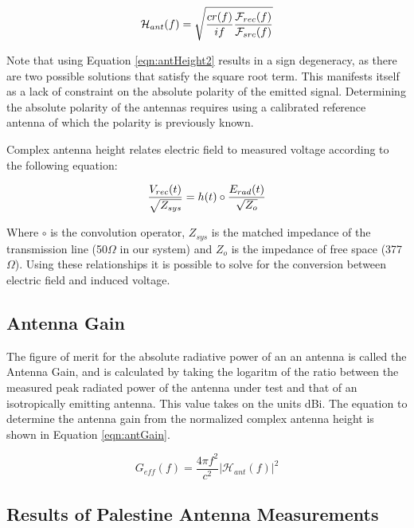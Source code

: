 \begin{equation}
\mathcal{H}_{ant}(f) = \sqrt{ \frac{c r(f)}{if} \frac{\mathcal{F}_{rec}(f)}{\mathcal{F}_{src}(f)} } \\
\label{eqn:antHeight2}
\end{equation}

Note that using Equation \ref{eqn:antHeight2} results in a sign degeneracy, as there are two possible solutions that satisfy the square root term.  This manifests itself as a lack of constraint on the absolute polarity of the emitted signal.  Determining the absolute polarity of the antennas requires using a calibrated reference antenna of which the polarity is previously known.


Complex antenna height relates electric field to measured voltage according to the following equation:

\begin{equation}
\frac{V_{rec}(t)}{\sqrt{Z_{sys}}} = h(t) \circ \frac{ E_{rad}(t) }{ \sqrt{Z_{o}} } \\
\label{eqn:antHeight2EField}
\end{equation}

Where $\circ$ is the convolution operator, $Z_{sys}$ is the matched impedance of the transmission line (50$\Omega$ in our system) and $Z_{o}$ is the impedance of free space (377$\Omega$).  Using these relationships it is possible to solve for the conversion between electric field and induced voltage.


	\subsection{Antenna Gain}
		The figure of merit for the absolute radiative power of an an antenna is called the Antenna Gain, and is calculated by taking the logaritm of the ratio between the measured peak radiated power of the antenna under test and that of an isotropically emitting antenna.  This value takes on the units dBi.  The equation to determine the antenna gain from the normalized complex antenna height is shown in Equation \ref{eqn:antGain}.
		
\begin{equation}
G_{eff}(f) =  \frac{4\pi f^{2}}{c^{2}} | \mathcal{H}_{ant}(f)|^{2}
\label{eqn:antGain}
\end{equation}

	\subsection{Results of Palestine Antenna Measurements}
	

